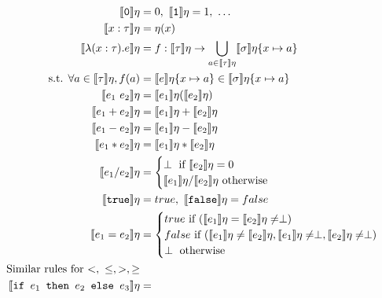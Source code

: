  \begin{figure}
 \begin{align*}
 \llbracket \texttt{0} \rrbracket\eta &= 0, \  \llbracket \texttt{1} \rrbracket\eta = 1, \ \ldots \\
  \llbracket x : \tau \rrbracket\eta &= \eta(x) \\
  \llbracket \lambda (x : \tau) . e \rrbracket\eta &= f : \llbracket \tau \rrbracket\eta 
  \rightarrow \bigcup_{a \in \llbracket \tau \rrbracket\eta} \llbracket \sigma \rrbracket\eta\{x\mapsto a\} \\
\text{ s.t. } \forall a \in \llbracket \tau \rrbracket\eta, f(a) &= \llbracket e \rrbracket\eta\{ x \mapsto a \} 
  \in \llbracket \sigma \rrbracket\eta\{x\mapsto a\}\\
 \llbracket e_1 \ e_2 \rrbracket \eta &= \llbracket e_1 \rrbracket\eta ( \llbracket e_2 \rrbracket\eta ) \\
 \llbracket e_1 + e_2 \rrbracket\eta &= \llbracket e_1 \rrbracket\eta + \llbracket e_2 \rrbracket\eta \\
 \llbracket e_1 - e_2 \rrbracket\eta &= \llbracket e_1 \rrbracket\eta - \llbracket e_2 \rrbracket\eta \\
 \llbracket e_1 * e_2 \rrbracket\eta &= \llbracket e_1 \rrbracket\eta * \llbracket e_2 \rrbracket\eta \\
  \llbracket e_1 / e_2 \rrbracket\eta &=
  \begin{cases}
  \perp \text{ if }  \llbracket e_2 \rrbracket\eta = 0 \\
   \llbracket e_1 \rrbracket\eta / \llbracket e_2 \rrbracket\eta \text{ otherwise}
   \end{cases} \\
  \llbracket \texttt{true} \rrbracket\eta &= true, \ \llbracket \texttt{false} \rrbracket\eta = false \\
 \llbracket e_1 = e_2 \rrbracket\eta &= 
 \begin{cases} 
      true \text{ if } (\llbracket e_1 \rrbracket\eta = \llbracket e_2 \rrbracket\eta \neq \perp) \\
      false \text{  if } (\llbracket e_1 \rrbracket\eta \neq \llbracket e_2\rrbracket\eta, \llbracket e_1 \rrbracket\eta \neq \perp, \llbracket e_2 \rrbracket\eta \neq \perp)\\
      \perp \text{ otherwise}
   \end{cases} \\
\text{Similar rules for $<, \ \leq, >, \geq$} \\
  \llbracket \ifelse{e_1}{e_2}{e_3} \rrbracket \eta &= 

\end{align*}
\end{figure}
